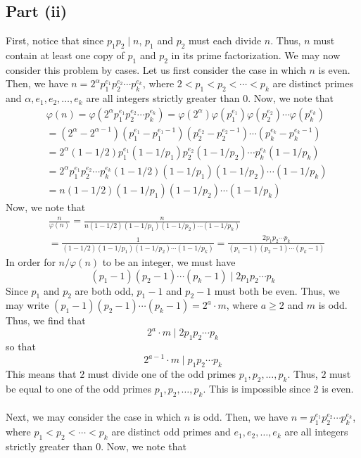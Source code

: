 \documentclass[12pt]{article}
\begin{document}
\subsection*{Part (ii)}
First, notice that since $p_1p_2 \mid n$, $p_1$ and $p_2$ must each divide $n$. Thus, $n$ must contain at least one copy of $p_1$ and $p_2$ in its prime factorization. We may now consider this problem by cases. Let us first consider the case in which $n$ is even. Then, we have $n = 2^{\alpha}p_1^{e_1}p_2^{e_2} \cdots p_k^{e_k}$, where $2 < p_1 < p_2 < \cdots < p_k$ are distinct primes and $\alpha, e_1, e_2, \ldots, e_k$ are all integers strictly greater than $0$. Now, we note that
\begin{align*}
& \varphi(n) = \varphi(2^{\alpha}p_1^{e_1} p_2^{e_2} \cdots p_k^{e_k}) = \varphi(2^\alpha)\varphi(p_1^{e_1})\varphi(p_2^{e_2})\cdots \varphi(p_k^{e_k}) \\ 
& = (2^\alpha - 2^{\alpha - 1})(p_1^{e_1} - p_1^{e_1 - 1})(p_2^{e_2} - p_2^{e_2 - 1})\cdots (p_k^{e_k} - p_k^{e_k - 1})\\
& = 2^\alpha(1-1/2)p_1^{e_1}(1-1/p_1)p_2^{e_2}(1-1/p_2)\cdots p_k^{e_k}(1-1/p_k) \\
& = 2^\alpha p_1^{e_1} p_2^{e_2} \cdots p_k^{e_k} (1-1/2)(1-1/p_1)(1-1/p_2)\cdots(1 - 1/p_k) \\
& = n (1-1/2) (1-1/p_1)(1-1/p_2)\cdots(1 - 1/p_k)
\end{align*} Now, we note that
\begin{align*}
&\frac{n}{\varphi(n)} = \frac{n}{n(1-1/2) (1-1/p_1)(1-1/p_2)\cdots(1 - 1/p_k)} \\
& = \frac{1}{(1-1/2) (1-1/p_1)(1-1/p_2)\cdots(1 - 1/p_k)} = \frac{2p_1p_2\cdots p_k}{(p_1-1)(p_2-1)\cdots(p_k-1)}
\end{align*} In order for $n/\varphi(n)$ to be an integer, we must have
\[
(p_1-1)(p_2-1)\cdots (p_k -1)  \mid 2 p_1 p_2 \cdots p_k
\] Since $p_1$ and $p_2$ are both odd, $p_1-1$ and $p_2 - 1$ must both be even. Thus, we may write $(p_1-1)(p_2-1)\cdots (p_k -1) = 2^a \cdot m$, where $a\geq 2$ and $m$ is odd. Thus, we find that
\[
2^a \cdot m \mid 2 p_1 p_2 \cdots p_k
\] so that
\[
2^{a-1} \cdot m \mid p_1 p_2 \cdots p_k
\] This means that $2$ must divide one of the odd primes $p_1,p_2,\ldots, p_k$. Thus, $2$ must be equal to one of the odd primes $p_1,p_2,\ldots,p_k$. This is impossible since $2$ is even.
\\ \\
Next, we may consider the case in which $n$ is odd. Then, we have $n = p_1^{e_1} p_2^{e_2} \cdots p_k^{e_k}$, where $p_1 < p_2 < \cdots < p_k$ are distinct odd primes and $e_1,e_2,\ldots,e_k$ are all integers strictly greater than $0$. Now, we note that
\end{document}
